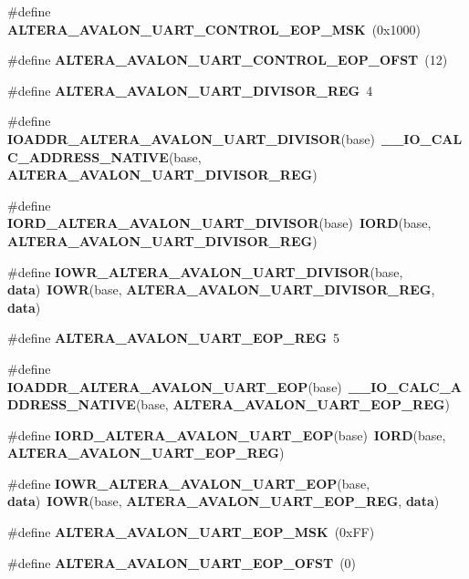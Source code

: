 \begin{DoxyCompactItemize}
\#define {\bf A\+L\+T\+E\+R\+A\+\_\+\+A\+V\+A\+L\+O\+N\+\_\+\+U\+A\+R\+T\+\_\+\+C\+O\+N\+T\+R\+O\+L\+\_\+\+E\+O\+P\+\_\+\+M\+SK}~(0x1000)
\item 
\#define {\bf A\+L\+T\+E\+R\+A\+\_\+\+A\+V\+A\+L\+O\+N\+\_\+\+U\+A\+R\+T\+\_\+\+C\+O\+N\+T\+R\+O\+L\+\_\+\+E\+O\+P\+\_\+\+O\+F\+ST}~(12)
\item 
\#define {\bf A\+L\+T\+E\+R\+A\+\_\+\+A\+V\+A\+L\+O\+N\+\_\+\+U\+A\+R\+T\+\_\+\+D\+I\+V\+I\+S\+O\+R\+\_\+\+R\+EG}~4
\item 
\#define {\bf I\+O\+A\+D\+D\+R\+\_\+\+A\+L\+T\+E\+R\+A\+\_\+\+A\+V\+A\+L\+O\+N\+\_\+\+U\+A\+R\+T\+\_\+\+D\+I\+V\+I\+S\+OR}(base)~{\bf \+\_\+\+\_\+\+I\+O\+\_\+\+C\+A\+L\+C\+\_\+\+A\+D\+D\+R\+E\+S\+S\+\_\+\+N\+A\+T\+I\+VE}(base, {\bf A\+L\+T\+E\+R\+A\+\_\+\+A\+V\+A\+L\+O\+N\+\_\+\+U\+A\+R\+T\+\_\+\+D\+I\+V\+I\+S\+O\+R\+\_\+\+R\+EG})
\item 
\#define {\bf I\+O\+R\+D\+\_\+\+A\+L\+T\+E\+R\+A\+\_\+\+A\+V\+A\+L\+O\+N\+\_\+\+U\+A\+R\+T\+\_\+\+D\+I\+V\+I\+S\+OR}(base)~{\bf I\+O\+RD}(base, {\bf A\+L\+T\+E\+R\+A\+\_\+\+A\+V\+A\+L\+O\+N\+\_\+\+U\+A\+R\+T\+\_\+\+D\+I\+V\+I\+S\+O\+R\+\_\+\+R\+EG})
\item 
\#define {\bf I\+O\+W\+R\+\_\+\+A\+L\+T\+E\+R\+A\+\_\+\+A\+V\+A\+L\+O\+N\+\_\+\+U\+A\+R\+T\+\_\+\+D\+I\+V\+I\+S\+OR}(base,  {\bf data})~{\bf I\+O\+WR}(base, {\bf A\+L\+T\+E\+R\+A\+\_\+\+A\+V\+A\+L\+O\+N\+\_\+\+U\+A\+R\+T\+\_\+\+D\+I\+V\+I\+S\+O\+R\+\_\+\+R\+EG}, {\bf data})
\item 
\#define {\bf A\+L\+T\+E\+R\+A\+\_\+\+A\+V\+A\+L\+O\+N\+\_\+\+U\+A\+R\+T\+\_\+\+E\+O\+P\+\_\+\+R\+EG}~5
\item 
\#define {\bf I\+O\+A\+D\+D\+R\+\_\+\+A\+L\+T\+E\+R\+A\+\_\+\+A\+V\+A\+L\+O\+N\+\_\+\+U\+A\+R\+T\+\_\+\+E\+OP}(base)~{\bf \+\_\+\+\_\+\+I\+O\+\_\+\+C\+A\+L\+C\+\_\+\+A\+D\+D\+R\+E\+S\+S\+\_\+\+N\+A\+T\+I\+VE}(base, {\bf A\+L\+T\+E\+R\+A\+\_\+\+A\+V\+A\+L\+O\+N\+\_\+\+U\+A\+R\+T\+\_\+\+E\+O\+P\+\_\+\+R\+EG})
\item 
\#define {\bf I\+O\+R\+D\+\_\+\+A\+L\+T\+E\+R\+A\+\_\+\+A\+V\+A\+L\+O\+N\+\_\+\+U\+A\+R\+T\+\_\+\+E\+OP}(base)~{\bf I\+O\+RD}(base, {\bf A\+L\+T\+E\+R\+A\+\_\+\+A\+V\+A\+L\+O\+N\+\_\+\+U\+A\+R\+T\+\_\+\+E\+O\+P\+\_\+\+R\+EG})
\item 
\#define {\bf I\+O\+W\+R\+\_\+\+A\+L\+T\+E\+R\+A\+\_\+\+A\+V\+A\+L\+O\+N\+\_\+\+U\+A\+R\+T\+\_\+\+E\+OP}(base,  {\bf data})~{\bf I\+O\+WR}(base, {\bf A\+L\+T\+E\+R\+A\+\_\+\+A\+V\+A\+L\+O\+N\+\_\+\+U\+A\+R\+T\+\_\+\+E\+O\+P\+\_\+\+R\+EG}, {\bf data})
\item 
\#define {\bf A\+L\+T\+E\+R\+A\+\_\+\+A\+V\+A\+L\+O\+N\+\_\+\+U\+A\+R\+T\+\_\+\+E\+O\+P\+\_\+\+M\+SK}~(0x\+F\+F)
\item 
\#define {\bf A\+L\+T\+E\+R\+A\+\_\+\+A\+V\+A\+L\+O\+N\+\_\+\+U\+A\+R\+T\+\_\+\+E\+O\+P\+\_\+\+O\+F\+ST}~(0)
\end{DoxyCompactItemize}


